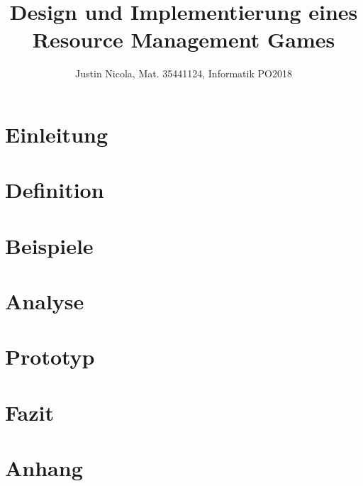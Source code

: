 \documentclass[12pt]{extarticle}
\title{Design und Implementierung eines Resource Management Games}
\author{Justin Nicola, Mat. 35441124, Informatik PO2018}
\begin{document}






\maketitle
\section{Einleitung}


\section{Definition}


\section{Beispiele}


\section{Analyse}


\section{Prototyp}


\newpage
\section{Fazit}


\newpage
\printbibliography

\newpage
\section{Anhang}

\end{document}
